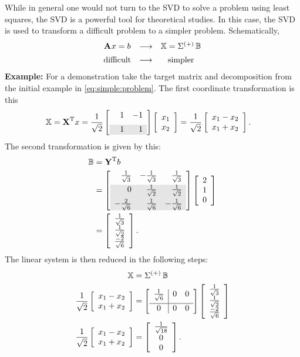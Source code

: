 While in general one would not turn to the SVD to solve a problem using least squares, the SVD is a powerful tool for theoretical studies. In this case, the SVD is used to transform a difficult problem to a simpler problem. Schematically,
$$
\begin{array}{ ccc }
  \textbf{A}^{\mathrm{}} x = b  & \longrightarrow  &  \mathbb{X} = \Sigma^{\mathrm{(+)}}\, \mathbb{B} \\[5pt]
   \text{difficult}  & \longrightarrow  &  \text{simpler}  \\
\end{array}
$$
\textbf{Example:} 
For a demonstration take the target matrix and decomposition from the initial example in \eqref{eq:simple:problem}. The first coordinate transformation is this
\begin{equation}
  \begin{split}
    \mathbb{X} & = \X{T} x = \Xtshade \mat{c}{x_{1}\\x_{2}} = \stwo \mat{c}{x_{1}-x_{2}\\x_{1}+x_{2}}.
  \end{split}
\end{equation}
The second transformation is given by this:
\begin{equation}
  \begin{split}
    \mathbb{B} & = \Y{T} b \\
    &= \Ytshade \phivector \\
    &= \mat{r}{\sthree \\ \stwo \\ \frac{-2}{\sqrt{6}}}.
  \end{split}
  \label{eq:morefomal:B}
\end{equation}
The linear system is then reduced in the following steps:
\begin{equation}
  \begin{split}
    \mathbb{X} &= 
    \sig{(+)}\,\mathbb{B} \\
    \stwo 
    \mat{c}{x_{1}-x_{2}\\x_{1}+x_{2}} & = 
    \Sigmainverse
    \mat{r}{\sthree \\ \stwo \\ \frac{-2}{\sqrt{6}}}\\
    \stwo 
    \mat{c}{x_{1}-x_{2}\\x_{1}+x_{2}} &= 
    \mat{c}{\frac{1}{\sqrt{18}} \\ 0 \\ 0}.
  \end{split}
\end{equation}
